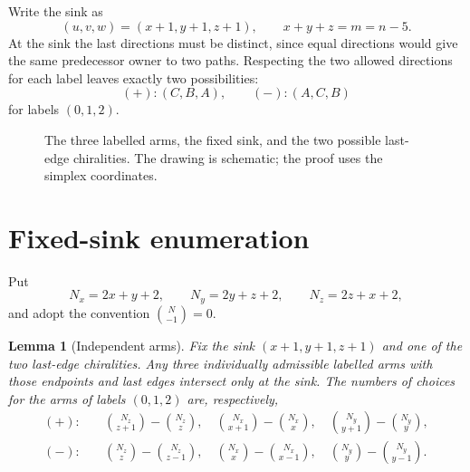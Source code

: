 \documentclass[11pt]{amsart}
\newtheorem{lemma}[theorem]{Lemma}
\theoremstyle{definition}
\begin{document}
Write the sink as
\[
 (u,v,w)=(x+1,y+1,z+1),\qquad x+y+z=m=n-5.
\]
At the sink the last directions must be distinct, since equal directions
would give the same predecessor owner to two paths.  Respecting the two
allowed directions for each label leaves exactly two possibilities:
\[
 (+):(C,B,A),\qquad (-):(A,C,B)
\]
for labels $(0,1,2)$.

\begin{figure}[H]
\centering
{}
\caption{The three labelled arms, the fixed sink, and the two possible
last-edge chiralities.  The drawing is schematic; the proof uses the simplex
coordinates.}
\label{fig:chiralities}
\end{figure}

\section{Fixed-sink enumeration}

Put
\[
 N_x=2x+y+2,\qquad N_y=2y+z+2,\qquad N_z=2z+x+2,
\]
and adopt the convention $\binom N{-1}=0$.

\begin{lemma}[Independent arms]\label{lem:independent-arms}
Fix the sink $(x+1,y+1,z+1)$ and one of the two last-edge chiralities.
Any three individually admissible labelled arms with those endpoints and last
edges intersect only at the sink.  The numbers of choices for the arms of
labels $(0,1,2)$ are, respectively,
\begin{align*}
 (+):\quad&
 \binom{N_z}{z+1}-\binom{N_z}{z},\quad
 \binom{N_x}{x+1}-\binom{N_x}{x},\quad
 \binom{N_y}{y+1}-\binom{N_y}{y},\\
 (-):\quad&
 \binom{N_z}{z}-\binom{N_z}{z-1},\quad
 \binom{N_x}{x}-\binom{N_x}{x-1},\quad
 \binom{N_y}{y}-\binom{N_y}{y-1}.
\end{align*}
\end{lemma}
\end{document}
